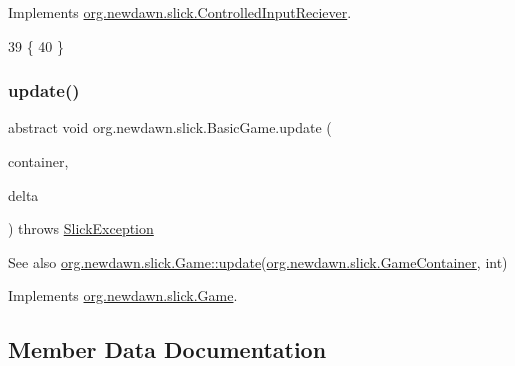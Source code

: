 Implements \mbox{\hyperlink{interfaceorg_1_1newdawn_1_1slick_1_1_controlled_input_reciever_ab838ca221a429b05c0b53aea9b4fe72f}{org.\+newdawn.\+slick.\+Controlled\+Input\+Reciever}}.


\begin{DoxyCode}
39                                       \{ 
40     \}
\end{DoxyCode}
\mbox{\label{classorg_1_1newdawn_1_1slick_1_1_basic_game_acfe6fa05aef83bff1631af91a3e4bd20}} 
\subsubsection{\texorpdfstring{update()}{update()}}
{\footnotesize\ttfamily abstract void org.\+newdawn.\+slick.\+Basic\+Game.\+update (\begin{DoxyParamCaption}\item[{\mbox{\hyperlink{classorg_1_1newdawn_1_1slick_1_1_game_container}{Game\+Container}}}]{container,  }\item[{int}]{delta }\end{DoxyParamCaption}) throws \mbox{\hyperlink{classorg_1_1newdawn_1_1slick_1_1_slick_exception}{Slick\+Exception}}\hspace{0.3cm}{\ttfamily [abstract]}}

\begin{DoxySeeAlso}{See also}
\mbox{\hyperlink{interfaceorg_1_1newdawn_1_1slick_1_1_game_ab07b2e9463ee4631620dde0de25bdee8}{org.\+newdawn.\+slick.\+Game\+::update}}(\mbox{\hyperlink{classorg_1_1newdawn_1_1slick_1_1_game_container}{org.\+newdawn.\+slick.\+Game\+Container}}, int) 
\end{DoxySeeAlso}


Implements \mbox{\hyperlink{interfaceorg_1_1newdawn_1_1slick_1_1_game_ab07b2e9463ee4631620dde0de25bdee8}{org.\+newdawn.\+slick.\+Game}}.



\subsection{Member Data Documentation}
\mbox{\label{classorg_1_1newdawn_1_1slick_1_1_basic_game_a77093ea9bb39adc83d2c1a0212efdf01}} 
